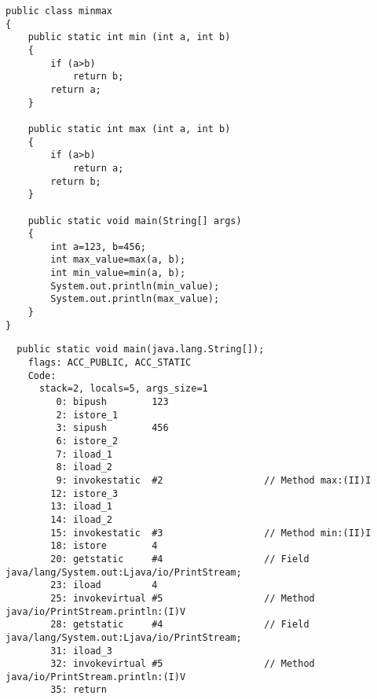

\begin{lstlisting}
public class minmax
{
	public static int min (int a, int b)
	{
		if (a>b)
			return b;
		return a;
	}

	public static int max (int a, int b)
	{
		if (a>b)
			return a;
		return b;
	}

	public static void main(String[] args)
	{
		int a=123, b=456;
		int max_value=max(a, b);
		int min_value=min(a, b);
		System.out.println(min_value);
		System.out.println(max_value);
	}
}
\end{lstlisting}


\begin{lstlisting}
  public static void main(java.lang.String[]);
    flags: ACC_PUBLIC, ACC_STATIC
    Code:
      stack=2, locals=5, args_size=1
         0: bipush        123
         2: istore_1      
         3: sipush        456
         6: istore_2      
         7: iload_1       
         8: iload_2       
         9: invokestatic  #2                  // Method max:(II)I
        12: istore_3      
        13: iload_1       
        14: iload_2       
        15: invokestatic  #3                  // Method min:(II)I
        18: istore        4
        20: getstatic     #4                  // Field java/lang/System.out:Ljava/io/PrintStream;
        23: iload         4
        25: invokevirtual #5                  // Method java/io/PrintStream.println:(I)V
        28: getstatic     #4                  // Field java/lang/System.out:Ljava/io/PrintStream;
        31: iload_3       
        32: invokevirtual #5                  // Method java/io/PrintStream.println:(I)V
        35: return        
\end{lstlisting}



